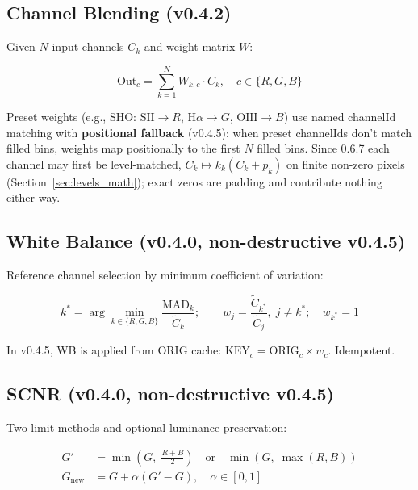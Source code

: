 \documentclass[11pt,a4paper]{article}
\begin{document}
    \subsection{Channel Blending (v0.4.2)}
    \label{sec:blend}

    Given $N$ input channels $C_k$ and weight matrix $W$:

    \begin{equation}
        \text{Out}_c = \sum_{k=1}^{N} W_{k,c} \cdot C_k, \quad c \in \{R, G, B\}
    \end{equation}

    Preset weights (e.g., SHO: $\text{SII} \to R$, $\text{H}\alpha \to G$, $\text{OIII} \to B$) use named channelId matching with \textbf{positional fallback} (v0.4.5): when preset channelIds don't match filled bins, weights map positionally to the first $N$ filled bins. Since 0.6.7 each channel may first be level-matched, $C_k \mapsto k_k (C_k + p_k)$ on finite non-zero pixels (Section~\ref{sec:levels_math}); exact zeros are padding and contribute nothing either way.

    \subsection{White Balance (v0.4.0, non-destructive v0.4.5)}
    \label{sec:white_balance}

    Reference channel selection by minimum coefficient of variation:

    \begin{equation}
        k^* = \arg\min_{k \in \{R, G, B\}} \frac{\text{MAD}_k}{\tilde{C}_k}; \qquad
        w_j = \frac{\tilde{C}_{k^*}}{\tilde{C}_j},\; j \neq k^*; \quad w_{k^*} = 1
    \end{equation}

    In v0.4.5, WB is applied from ORIG cache: $\text{KEY}_c = \text{ORIG}_c \times w_c$. Idempotent.

    \subsection{SCNR (v0.4.0, non-destructive v0.4.5)}
    \label{sec:scnr}

    Two limit methods and optional luminance preservation:

    \begin{align}
        G' &= \min\!\left(G,\; \tfrac{R + B}{2}\right) \quad\text{or}\quad \min(G,\; \max(R, B)) \\[4pt]
        G_{\text{new}} &= G + \alpha (G' - G), \quad \alpha \in [0, 1]
    \end{align}
\end{document}
